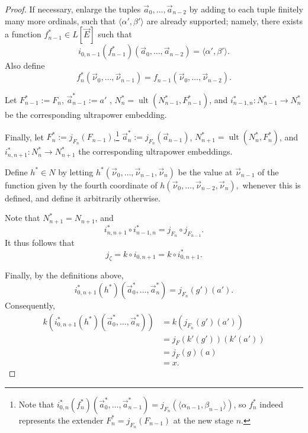 \documentclass{article}
\theoremstyle{definition}
\theoremstyle{plain}
\newcommand{\la}{\langle}
\newcommand{\ra}{\rangle}
\DeclareMathOperator{\Ult}{ult}
\begin{document}
\begin{proof}
If necessary, enlarge the tuples $\vec{a}_0,\ldots, \vec{a}_{n-2}$ by adding to each tuple finitely many more ordinals, such that $\la \alpha', \beta' \ra$ are already supported; namely, there exists a function $f_{n-1}^*\in L[\vec E]$ such that
$$i_{0,n-1}(f_{n-1}^*)(\vec a_0,\ldots,\vec a_{n-2})=\la\alpha',\beta'\ra.$$
Also define
$$f^*_n(\vec\nu_0,\ldots,\vec\nu_{n-1})=f_{n-1}(\vec\nu_0,\ldots,\vec\nu_{n-2}).$$

Let $F^*_{n-1}:=F_n$, $\vec a_{n-1}^*:=a'$  , $N^*_{n} = \Ult(N^*_{n-1}, F^*_{n-1})$, and $i_{n-1,n}^*\colon N^*_{n-1}\to N^*_{n}$ be the corresponding ultrapower embedding.

Finally, let $F^*_n:=j_{F_n}(F_{n-1})$,\footnote{Note that $i_{0,n}^*(f_n^*)(\vec a_0^*,\ldots,\vec a_{n-1}^*)=
j_{F_n}(\la\alpha_{n-1},\beta_{n-1}\ra)$, so $f^*_n$ indeed represents the extender $F^*_n=j_{F_n}(F_{n-1})$ at the new stage $n$.} $\vec a_n^*:=j_{F_n}(\vec a_{n-1})$, $N^*_{n+1} = \Ult( N^*_{n}, F^*_{n} )$, and $i_{n,n+1}^*\colon N^*_{n}\to N^*_{n+1}$ the corresponding ultrapower embeddings. 

Define $h^*\in N$ by letting $h^*(\vec\nu_0,\ldots, \vec{\nu}_{n-1}, \vec\nu_n)
$ be the value at $\vec\nu_{n-1}$ of the function given by the fourth coordinate of $h(\vec\nu_0,\ldots,\vec\nu_{n-2},\vec\nu_n),$
whenever this is defined, and define it arbitrarily otherwise. 

Note that $N_{n+1}^* = N_{n+1}$, and
$$i_{n,n+1}^*\circ i_{n-1,n}^*=j_{F_n}\circ j_{F_{n-1}}.$$
It thus follows that  
$$j_\zeta=k\circ i_{0,n+1}=k\circ i_{0,n+1}^*.$$

Finally, by the definitions above,
$$i_{0,n+1}^*(h^*)(\vec a_0^*,\ldots,\vec a_n^*) = j_{F_n}(g')(a').$$
Consequently,
\begin{align*}
k\left(
i_{0,n+1}^*(h^*)
(\vec a_0^*,\ldots,\vec a_n^*)
\right)
&=
k\left(j_{F_n}(g')(a')\right)\\
&=
j_F(k'(g'))(k'(a'))\\
&=
j_F(g)(a)\\
&=
x.
\end{align*}
\end{proof}
\end{document}
